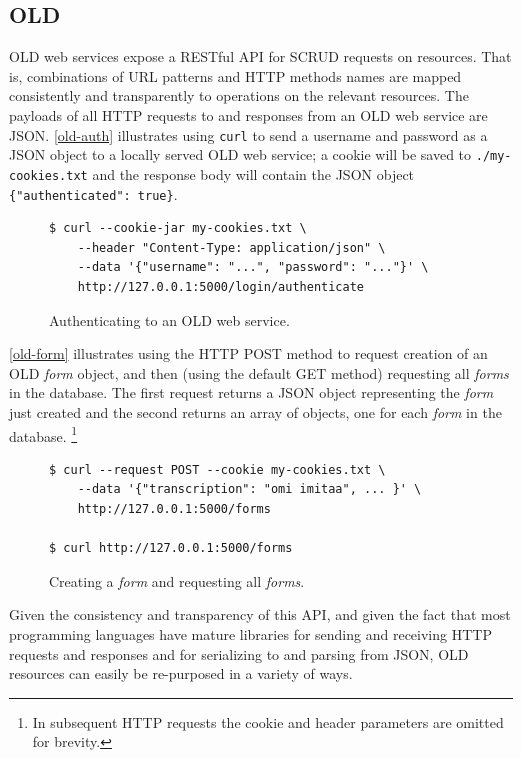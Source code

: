 \documentclass[11pt]{article}
\begin{document}
\subsection{OLD}

OLD web services expose a RESTful API for SCRUD requests on resources. That is,
combinations of URL patterns and HTTP methods names are mapped consistently and
transparently to operations on the relevant resources. The payloads of all HTTP
requests to and responses from an OLD web service are JSON. \autoref{old-auth}
illustrates using \texttt{curl} to send a username and password as a JSON object
to a locally served OLD web service; a cookie will be saved to \texttt{./my-cookies.txt} and
the response body will contain the JSON object \texttt{\{"authenticated":
true\}}.

\begin{figure}[h]
\scriptsize
\begin{verbatim}
$ curl --cookie-jar my-cookies.txt \
    --header "Content-Type: application/json" \
    --data '{"username": "...", "password": "..."}' \
    http://127.0.0.1:5000/login/authenticate
\end{verbatim}
\normalsize
\caption{Authenticating to an OLD web service.}
\label{old-auth}
\end{figure}

\autoref{old-form} illustrates using the HTTP POST method to request creation
of an OLD \emph{form} object, and then (using the default GET method) requesting all
\emph{forms} in the database. The first request returns a JSON object representing the
\emph{form} just created and the second returns an array of objects, one for each \emph{form}
in the database.%
\footnote{In subsequent HTTP requests the cookie and header parameters are
omitted for brevity.}

\begin{figure}[h]
\scriptsize
\begin{verbatim}
$ curl --request POST --cookie my-cookies.txt \
    --data '{"transcription": "omi imitaa", ... }' \
    http://127.0.0.1:5000/forms

$ curl http://127.0.0.1:5000/forms
\end{verbatim}
\normalsize
\caption{Creating a \emph{form} and requesting all \emph{forms}.}
\label{old-form}
\end{figure}

Given the consistency and transparency of this API, and given the fact that
most programming languages have mature libraries for sending and receiving 
HTTP requests and responses and for serializing to and parsing from JSON, OLD
resources can easily be re-purposed in a variety of ways.
\end{document}
